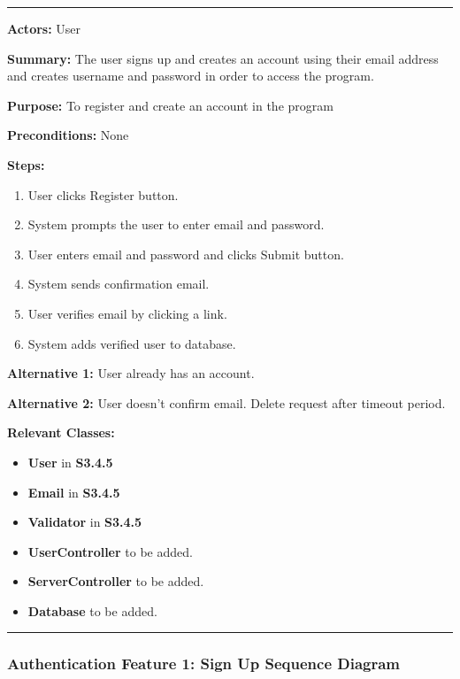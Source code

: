 \documentclass[twoside,letterpaper]{article}
\begin{document}
\vspace{2pt}
\hrule
\vspace{8pt}
\textbf{Actors:} User \newline

\noindent\textbf{Summary:} The user signs up and creates an account using their email address and creates username and password in order to access the program. \newline

\noindent\textbf{Purpose:} To register and create an account in the program \newline

\noindent\textbf{Preconditions:} None \newline

\noindent\textbf{Steps:} \begin{enumerate}
	\item User clicks Register button.
	\item System prompts the user to enter email and password.
	\item User enters email and password and clicks Submit button.
	\item System sends confirmation email.
	\item User verifies email by clicking a link.
	\item System adds verified user to database.
\end{enumerate}
\noindent\textbf{Alternative 1:} User already has an account. \newline

\noindent\textbf{Alternative 2:} User doesn't confirm email. Delete request after timeout period. \newline

\noindent\textbf{Relevant Classes:}
\begin{itemize}
	\item \textbf{User} in \textbf{S3.4.5}
	\item \textbf{Email} in \textbf{S3.4.5}
	\item \textbf{Validator} in \textbf{S3.4.5}
	\item \textbf{UserController} to be added.
	\item \textbf{ServerController} to be added.
	\item \textbf{Database} to be added.
\end{itemize}
\vspace{8pt}
\hrule
\newpage

\subsubsection[Authentication Feature 1: Sign Up Sequence Diagram]{\rmfamily\bfseries\color{black}
	Authentication Feature 1: Sign Up Sequence Diagram}
	\label{a:sd1}
\hypertarget{RefHeading22059017292}{}
\end{document}
